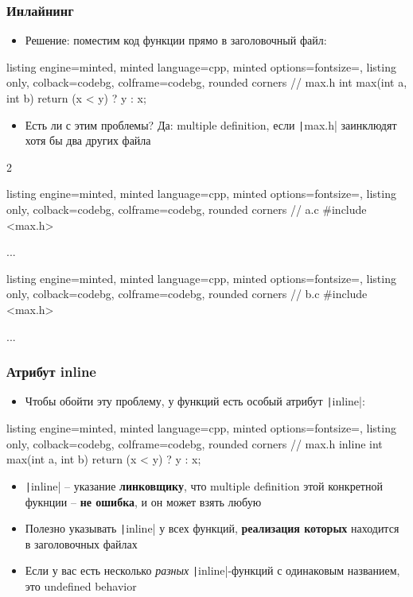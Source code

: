 \documentclass[10pt]{beamer}
\begin{document}
\begin{frame}[fragile]
\frametitle{Инлайнинг}
\begin{itemize}
\item Решение: поместим код функции прямо в заголовочный файл:
\end{itemize}
\begin{tcblisting}{listing engine=minted, minted language=cpp, minted options={fontsize=\scriptsize}, listing only, colback=codebg, colframe=codebg, rounded corners}
// max.h
int max(int a, int b) {
  return (x < y) ? y : x;
}
\end{tcblisting}
\pause
\begin{itemize}
\item Есть ли с этим проблемы? \pause Да: multiple definition, если \texttt|max.h| заинклюдят хотя бы два других файла
\end{itemize}
\begin{multicols}{2}
\begin{tcblisting}{listing engine=minted, minted language=cpp, minted options={fontsize=\scriptsize}, listing only, colback=codebg, colframe=codebg, rounded corners}
// a.c
#include <max.h>

...
\end{tcblisting}
\columnbreak
\begin{tcblisting}{listing engine=minted, minted language=cpp, minted options={fontsize=\scriptsize}, listing only, colback=codebg, colframe=codebg, rounded corners}
// b.c
#include <max.h>

...
\end{tcblisting}
\end{multicols}
\end{frame}

\begin{frame}[fragile]
\frametitle{Атрибут inline}
\begin{itemize}
\item Чтобы обойти эту проблему, у функций есть особый атрибут \texttt|inline|:
\end{itemize}
\begin{tcblisting}{listing engine=minted, minted language=cpp, minted options={fontsize=\scriptsize}, listing only, colback=codebg, colframe=codebg, rounded corners}
// max.h
inline int max(int a, int b) {
  return (x < y) ? y : x;
}
\end{tcblisting}
\pause
\begin{itemize}
\item \texttt|inline| -- указание \textbf{линковщику}, что multiple definition этой конкретной фукнции -- \textbf{не ошибка}, и он может взять любую
\pause
\item Полезно указывать \texttt|inline| у всех функций, \textbf{реализация которых} находится в заголовочных файлах
\pause
\item Если у вас есть несколько \textit{разных} \texttt|inline|-функций с одинаковым названием, это undefined behavior
\end{itemize}
\end{frame}
\end{document}
